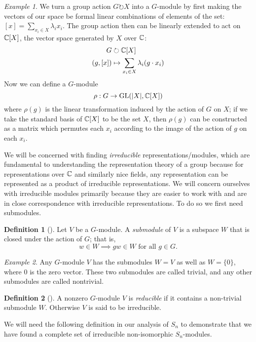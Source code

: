 \documentclass[12pt,twoside]{reedthesis}
\theoremstyle{plain}   %
\theoremstyle{definition}
\newtheorem{defn}{Definition}[section]
\theoremstyle{remark}
\newtheorem{ex}{Example}[section]
\numberwithin{equation}{section}
\def\GL{\mathrm{GL}} \def\SL{\mathrm{SL}}  \def\SP{\mathrm{SL}}\def\OG{\mathrm{O}}
\def\acts{\circlearrowright} %
\begin{document}
  \begin{ex} We turn a group action $G \acts X$ into a $G$-module by first making the vectors of our space be
    formal linear combinations of elements of the set: $[x] = \sum_{x_i \in X} \lambda_i x_i$.
    The group action then can be linearly extended to act on $\mathbb{C}[X]$, the vector space generated by $X$ over $\mathbb{C}$:
    \begin{align*}
      G &\acts \CC [X] \\
      (g,[x]) &\mapsto \sum_{x_i \in X} \lambda_i (g \cdot x_i)
    \end{align*}
    Now we can define a $G$-module
    \[ \rho: G \to \GL(|X|, \CC [X])\]
    where $\rho(g)$ is the linear transformation induced by the action of $G$ on $X$; if we take the standard basis of $\mathbb{C} [X]$ to be
    the set $X$, then $\rho(g)$ can be constructed as a matrix which permutes each $x_i$ according to the image of the action of $g$ on each $x_i$.
  \end{ex}
  We will be concerned with finding \emph{irreducible} representations/modules,
  which are fundamental to understanding the representation theory of a group because
  for representations over $\mathbb{C}$ and similarly nice fields, any representation can be represented as a product of irreducible representations.
  We will concern ourselves with irreducible modules primarily because they are easier to work with and are in close correspondence
  with irreducible representations. To do so we first need submodules.
  \begin{defn}[{\cite[Definition 1.4.1]{sagan}}]
    Let $V$ be a $G$-module. A \emph{submodule}
    of $V$ is a subspace $W$ that is closed under the action of $G$; that is,
    \[w \in W \implies gw \in W \text{ for all } g \in G.\]
  \end{defn}
  \begin{ex}
    Any $G$-module $V$ has the submodules $W=V$ as well as $W= \{0\}$, where $0$ is the zero vector.
    These two submodules are called trivial, and any other submodules are called nontrivial.
  \end{ex}
  \begin{defn}[{\cite[Definition 1.4.1]{sagan}}]
    A nonzero $G$-module $V$ is \emph{reducible} if it contains a non-trivial submodule $W$.
    Otherwise $V$ is said to be irreducible.
  \end{defn}

  We will need the following definition in our analysis of $S_n$ to demonstrate that we have found a complete set of irreducible non-isomorphic $S_n$-modules.
\end{document}
